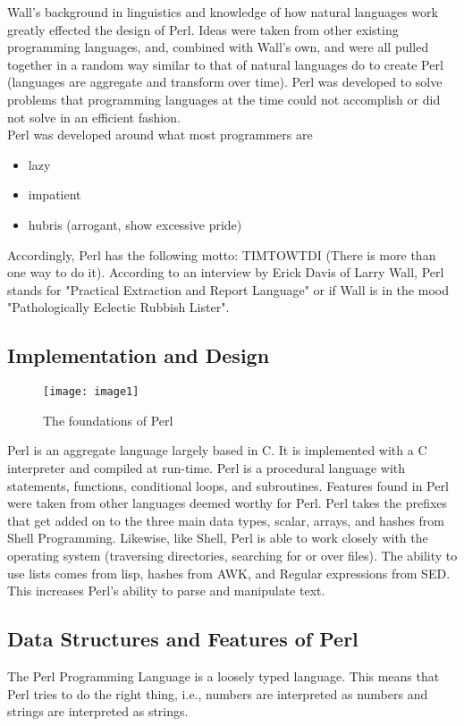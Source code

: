 \documentclass[11pt,a4paper]{article}
\begin{document}
\noindent Wall's background in linguistics and knowledge of how natural languages work greatly effected the design of Perl. Ideas were taken from other existing programming languages, and, combined with Wall's own, and were all pulled together in a random way similar to that of natural languages do to create Perl (languages are aggregate and transform over time). Perl was developed to solve problems that programming languages at the time could not accomplish or did not solve in an efficient fashion.  \\
\noindent Perl was developed around what most programmers are \cite{02}\begin{itemize}
\item lazy
\item impatient
\item hubris (arrogant, show excessive pride)
\end{itemize}
\noindent Accordingly, Perl has the following motto: TIMTOWTDI (There is more than one way to do it). According to an interview by Erick Davis of Larry Wall, Perl stands for "Practical Extraction and Report Language" or if Wall is in the mood "Pathologically Eclectic Rubbish Lister"\cite{01}. \\
\subsection{Implementation and Design}
\begin{figure}[h!]
  \center
    \texttt{[image: image1]}
  \begin{center}
  \caption{The foundations of Perl}
  \cite{03}
  \end{center}
\end{figure}
\noindent Perl is an aggregate language largely based in C. It is implemented with a C interpreter and compiled at run-time. Perl is a procedural language with statements, functions, conditional loops, and subroutines. Features found in Perl were taken from other languages deemed worthy for Perl. Perl takes the prefixes that get added on to the three main data types, scalar, arrays, and hashes from Shell Programming. Likewise, like Shell, Perl is able to work closely with the operating system (traversing directories, searching for  or over files). The ability to use lists comes from lisp, hashes from AWK, and Regular expressions from SED. This increases Perl's ability to parse and manipulate text.\\

\subsection{Data Structures and Features of Perl}
The Perl Programming Language is a loosely typed language. This means that Perl tries to do the right thing, i.e., numbers are interpreted as numbers and strings are interpreted as strings.\\          
\end{document}
